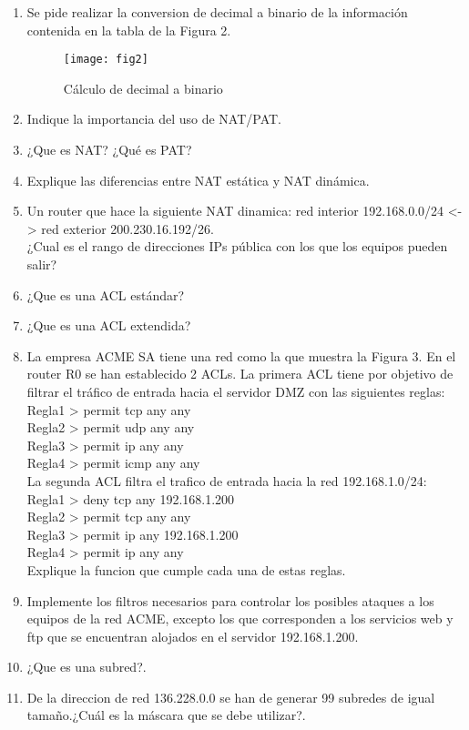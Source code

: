 \documentclass{udparticle}
\begin{document}
\begin{enumerate}
\item Se pide realizar la conversion de decimal a binario de la información contenida en la tabla de la Figura 2.
	\begin{figure}[H]
	\centering
	\texttt{[image: fig2]}
	\caption{Cálculo de decimal a binario}
	\end{figure}

\item Indique la importancia del uso de NAT/PAT.
\item ¿Que es NAT? ¿Qué es PAT?
\item Explique las diferencias entre NAT estática y NAT dinámica.
\item Un router que hace la siguiente NAT dinamica: red interior 
192.168.0.0/24 <-> red exterior 200.230.16.192/26.\\
¿Cual es el rango de direcciones IPs pública con los que los equipos 
pueden salir?
\item ¿Que es una ACL estándar?
\item ¿Que es una ACL extendida?
\item La empresa ACME SA tiene una red como la que muestra la Figura 3. 
En el router R0 se han establecido 2 ACLs. La primera ACL tiene por 
objetivo de filtrar el tráfico de entrada hacia el 
servidor DMZ con las siguientes reglas:\\
Regla1 > permit tcp any any\\
Regla2 > permit udp any any\\
Regla3 > permit ip any any\\
Regla4 > permit icmp any any\\
La segunda ACL filtra el trafico de entrada hacia la red 
192.168.1.0/24:\\
Regla1 > deny tcp any 192.168.1.200\\
Regla2 > permit tcp any any\\
Regla3 > permit ip any 192.168.1.200\\
Regla4 > permit ip any any\\
Explique la funcion que cumple cada una de estas reglas.\\
\item Implemente los filtros necesarios para controlar los posibles ataques a los equipos de la red ACME, excepto los que corresponden a los servicios web y ftp que se encuentran alojados en el
servidor 192.168.1.200.
\item ¿Que es una subred?.
\item De la direccion de red 136.228.0.0 se han de generar 99 subredes de igual tamaño.¿Cuál es la máscara que se debe utilizar?.

\end{enumerate}
\end{document}
